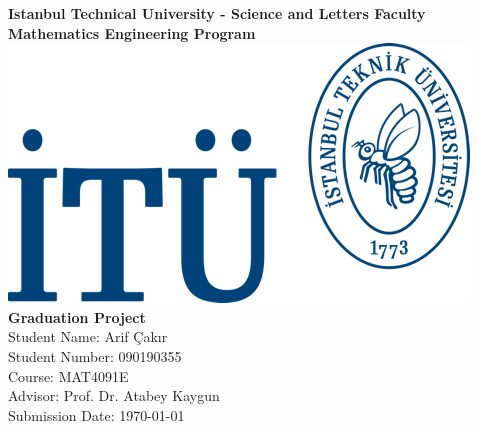 \documentclass[man]{apa7}
\begin{document}
\begin{titlepage}
\centering
{\large \textbf{ Istanbul Technical University - Science and Letters Faculty}}\\
{\large \textbf{Mathematics Engineering Program}}\\[4\baselineskip]
\includegraphics[scale = 1.5]{itülogo.png}\\[6\baselineskip]
{\LARGE \textbf{Graduation Project}}\\[2\baselineskip]

{\Large Student Name: Arif Çakır}\\
{\large Student Number: 090190355}\\
{\large Course: MAT4091E}\\
{\large Advisor: Prof. Dr. Atabey Kaygun}\\
{\large Submission Date: \today}\\
\end{titlepage}
\tableofcontents
\pagebreak
\end{document}
